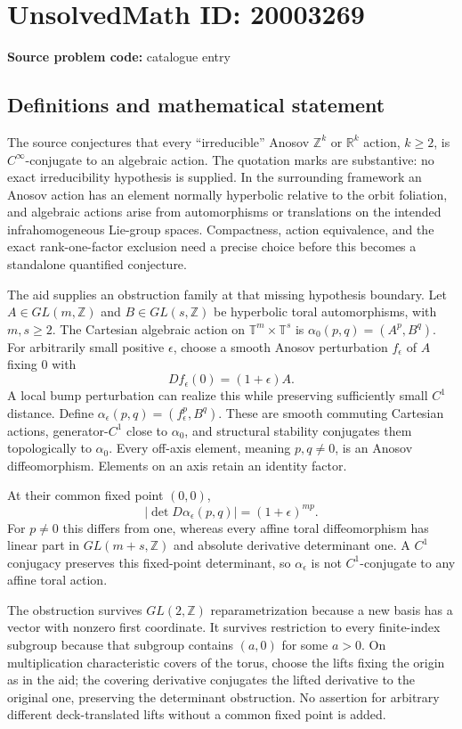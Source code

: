 \documentclass[11pt]{article}
\newcommand{\Z}{\mathbb{Z}}
\newcommand{\R}{\mathbb{R}}
\begin{document}
\section*{UnsolvedMath ID: 20003269}
\textbf{Source problem code:} catalogue entry
\subsection{Definitions and mathematical statement}
The source conjectures that every ``irreducible'' Anosov $\Z^k$ or $\R^k$ action, $k\geq2$, is $C^\infty$-conjugate to an algebraic action. The quotation marks are substantive: no exact irreducibility hypothesis is supplied. In the surrounding framework an Anosov action has an element normally hyperbolic relative to the orbit foliation, and algebraic actions arise from automorphisms or translations on the intended infrahomogeneous Lie-group spaces. Compactness, action equivalence, and the exact rank-one-factor exclusion need a precise choice before this becomes a standalone quantified conjecture.

The aid supplies an obstruction family at that missing hypothesis boundary. Let $A\in GL(m,\Z)$ and $B\in GL(s,\Z)$ be hyperbolic toral automorphisms, with $m,s\geq2$. The Cartesian algebraic action on $\mathbb T^m\times\mathbb T^s$ is $\alpha_0(p,q)=(A^p,B^q)$. For arbitrarily small positive $\epsilon$, choose a smooth Anosov perturbation $f_\epsilon$ of $A$ fixing $0$ with
\[
Df_\epsilon(0)=(1+\epsilon)A.
\]
A local bump perturbation can realize this while preserving sufficiently small $C^1$ distance. Define $\alpha_\epsilon(p,q)=(f_\epsilon^p,B^q)$. These are smooth commuting Cartesian actions, generator-$C^1$ close to $\alpha_0$, and structural stability conjugates them topologically to $\alpha_0$. Every off-axis element, meaning $p,q\ne0$, is an Anosov diffeomorphism. Elements on an axis retain an identity factor.

At their common fixed point $(0,0)$,
\[
|\det D\alpha_\epsilon(p,q)|=(1+\epsilon)^{mp}.
\]
For $p\ne0$ this differs from one, whereas every affine toral diffeomorphism has linear part in $GL(m+s,\Z)$ and absolute derivative determinant one. A $C^1$ conjugacy preserves this fixed-point determinant, so $\alpha_\epsilon$ is not $C^1$-conjugate to any affine toral action.

The obstruction survives $GL(2,\Z)$ reparametrization because a new basis has a vector with nonzero first coordinate. It survives restriction to every finite-index subgroup because that subgroup contains $(a,0)$ for some $a>0$. On multiplication characteristic covers of the torus, choose the lifts fixing the origin as in the aid; the covering derivative conjugates the lifted derivative to the original one, preserving the determinant obstruction. No assertion for arbitrary different deck-translated lifts without a common fixed point is added.
\end{document}
